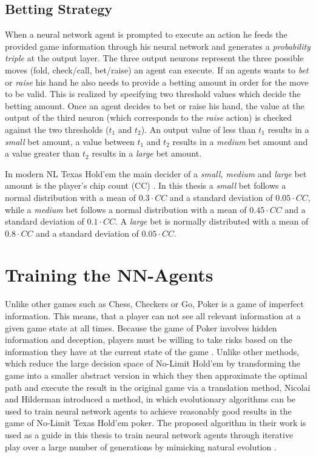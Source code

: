 \subsection{Betting Strategy}
\label{subsec:betting}
When a neural network agent is prompted to execute an action he feeds the provided game information through his neural network and generates a \textit{probability triple} at the output layer. The three output neurons represent the three possible moves (fold, check/call, bet/raise) an agent can execute. If an agents wants to \textit{bet} or \textit{raise} his hand he also needs to provide a betting amount in order for the move to be valid. This is realized by specifying two threshold values which decide the betting amount. Once an agent decides to bet or raise his hand, the value at the output of the third neuron (which corresponds to the \textit{raise} action) is checked against the two thresholds ($t_1$ and $t_2$). An output value of less than $t_1$ results in a \textit{small} bet amount, a value between $t_1$ and $t_2$ results in a \textit{medium} bet amount and a value greater than $t_2$ results in a \textit{large} bet amount.\par
	In modern NL Texas Hold'em the main decider of a \textit{small, medium} and \textit{large} bet amount is the player's chip count (CC) \cite{evolutionary_methods}. In this thesis a \textit{small} bet follows a normal distribution with a mean of $0.3 \cdot CC$ and a standard deviation of $0.05 \cdot CC$, while a \textit{medium} bet follows a normal distribution with a mean of $0.45 \cdot CC$ and a standard deviation of $0.1 \cdot CC$. A \textit{large} bet is normally distributed with a mean of $0.8 \cdot CC$ and a standard deviation of $0.05 \cdot CC$.
\pagebreak
\section{Training the NN-Agents}
Unlike other games such as Chess, Checkers or Go, Poker is a game of imperfect information. This means, that a player can not see all relevant  information at a given game state at all times. Because the game of Poker involves hidden information and deception, players must be willing to take risks based on the information they have at the current state of the game \cite{nn_evolve}. Unlike other methods, which reduce the large decision space of No-Limit Hold'em by transforming the game into a smaller abstract version in which they then approximate the optimal path and execute the result in the original game via a translation method, Nicolai and Hilderman \cite{nn_evolve} introduced a method, in which evolutionary algorithms can be used to train neural network agents to achieve reasonably good results in the game of No-Limit Texas Hold'em poker. The proposed algorithm in their work is used as a guide in this thesis to train neural network agents through iterative play over a large number of generations by mimicking natural evolution \cite{nn_evolve}.
